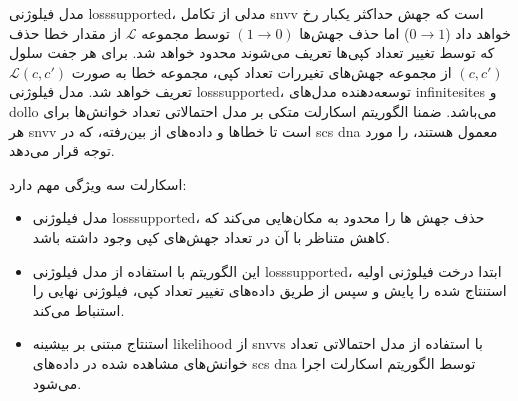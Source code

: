 مدل فیلوژنی \gls{losssupported}،  مدلی از تکامل \gls{snvv} است که جهش حداکثر یکبار رخ خواهد داد ($0\rightarrow 1$) اما حذف جهش‌ها
 $(1\rightarrow 0)$
  توسط مجموعه
$\mathcal{L}$
از مقدار خطا حذف که توسط تغییر تعداد کپی‌ها تعریف می‌شوند محدود خواهد شد. برای هر جفت سلول
$(c,c')$
از مجموعه جهش‌های تغیررات تعداد کپی، مجموعه خطا به صورت
$\mathcal{L}(c, c')$
تعریف خواهد شد. مدل فیلوژنی \gls{losssupported}، توسعه‌دهنده مدل‌های \gls{infinitesites} و \gls{dollo} می‌باشد. ضمنا الگوریتم اسکارلت متکی بر مدل احتمالاتی تعداد خوانش‌ها برای هر \gls{snvv} است تا خطاها و داده‌های از بین‌رفته، که در  \gls{scs} \gls{dna} معمول هستند، را مورد توجه قرار می‌دهد. 

اسکارلت سه ویژگی مهم دارد: 
\begin{itemize}
	\item     مدل فیلوژنی \gls{losssupported}، حذف جهش ها را محدود به مکان‌هایی می‌کند که کاهش متناظر با آن در تعداد جهش‌های کپی وجود داشته باشد. 
	
	\item 	این الگوریتم با استفاده از مدل فیلوژنی \gls{losssupported}، ابتدا درخت فیلوژنی اولیه استنتاج شده را پایش  و سپس از طریق داده‌های تغییر تعداد کپی، فیلوژنی نهایی را استنباط می‌کند. 
	\item	استنتاج مبتنی بر بیشینه  \gls{likelihood}  از \glspl{snvv} با استفاده از مدل احتمالاتی تعداد خوانش‌های مشاهده شده در داده‌های   \gls{scs} \gls{dna} توسط الگوریتم اسکارلت اجرا می‌شود.  
\end{itemize}

